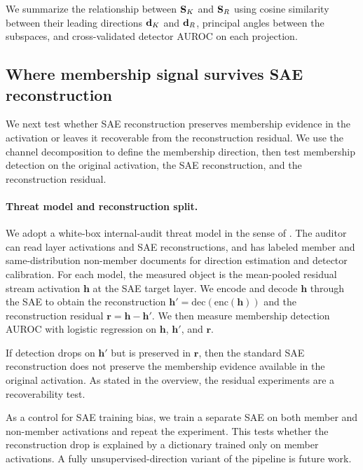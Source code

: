 We summarize the relationship between $\mathbf{S}_K$ and $\mathbf{S}_R$ using cosine similarity between their leading directions $\mathbf{d}_K$ and $\mathbf{d}_R$, principal angles between
the subspaces, and cross-validated detector AUROC on each projection.

\subsection{Where membership signal survives SAE reconstruction}
\label{sec:methods:sae_recon}

We next test whether SAE reconstruction preserves membership evidence in the activation or leaves it recoverable from the reconstruction residual. We use the channel decomposition to define the membership direction, then test membership detection on the original activation, the SAE reconstruction, and the reconstruction residual.

\paragraph{Threat model and reconstruction split.}
We adopt a white-box internal-audit threat model in the sense of \citet{carlini2023quantifying}. The auditor can read layer activations and SAE
reconstructions, and has labeled member and same-distribution non-member documents for direction estimation and detector calibration. For each model, the
measured object is the mean-pooled residual stream activation $\mathbf{h}$ at the SAE target layer. We encode and decode $\mathbf{h}$ through the SAE to
obtain the reconstruction $\mathbf{h}' = \text{dec}(\text{enc}(\mathbf{h}))$ and the reconstruction residual $\mathbf{r} = \mathbf{h} - \mathbf{h}'$. We
then measure membership detection AUROC with logistic regression on $\mathbf{h}$, $\mathbf{h}'$, and $\mathbf{r}$.

If detection drops on $\mathbf{h}'$ but is preserved in $\mathbf{r}$, then the standard SAE reconstruction does not preserve the membership evidence
available in the original activation. As stated in the overview, the residual experiments are a recoverability test.

As a control for SAE training bias, we train a separate SAE on both member and non-member activations and repeat the experiment. This tests whether the
reconstruction drop is explained by a dictionary trained only on member activations. A fully unsupervised-direction variant of the pipeline is future
work.

